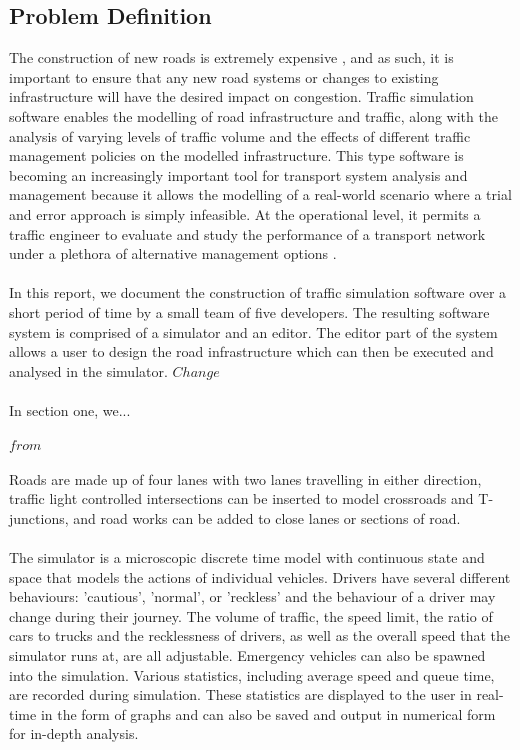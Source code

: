 \subsection*{Problem Definition}
The construction of new roads is extremely expensive \cite{BBC}, and as such, it is important to ensure that any new road systems or changes to existing infrastructure will have the desired impact on congestion. Traffic simulation software enables the modelling of road infrastructure and traffic, along with the analysis of varying levels of traffic volume and the effects of different traffic management policies on the modelled infrastructure. This type software is becoming an increasingly important tool for transport system analysis and management because it allows the modelling of a real-world scenario where a trial and error approach is simply infeasible. At the operational level, it permits a traffic engineer to evaluate and study the performance of a transport network under a plethora of alternative management options \cite{hidas2002modelling}.

\paragraph{}
In this report, we document the construction of traffic simulation software over a short period of time by a small team of five developers.
The resulting software system is comprised of a simulator and an editor. The editor part of the system allows a user to design the road infrastructure which can then be executed and analysed in the simulator. 
$Change$
\\\\
In section one, we...
\\\\
$from$
\\\\
Roads are made up of four lanes with two lanes travelling in either direction, traffic light controlled intersections can be inserted to model crossroads and T-junctions, and road works can be added to close lanes or sections of road.

\paragraph{}
The simulator is a microscopic discrete time model with continuous state and space that models the actions of individual vehicles. Drivers have several different behaviours: 'cautious', 'normal', or 'reckless' and the behaviour of a driver may change during their journey. The volume of traffic, the speed limit, the ratio of cars to trucks and the recklessness of drivers, as well as the overall speed that the simulator runs at, are all adjustable. Emergency vehicles can also be spawned into the simulation. Various statistics, including average speed and queue time, are recorded during simulation. These statistics are displayed to the user in real-time in the form of graphs and can also be saved and output in numerical form for in-depth analysis.